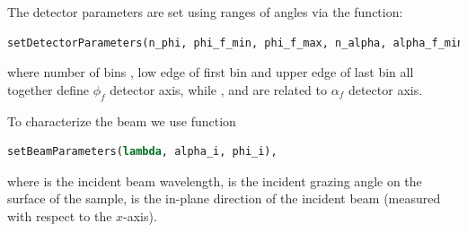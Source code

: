The detector parameters are set using ranges of angles via
the function:

\begin{lstlisting}[language=python, style=eclipse,numbers=none]
setDetectorParameters(n_phi, phi_f_min, phi_f_max, n_alpha, alpha_f_min, alpha_f_max),
\end{lstlisting}


\noindent where number of bins , low edge of first bin  and
upper edge of last bin  all together define $\phi_f$ detector axis, 
while ,  and  are related to 
$\alpha_f$ detector axis.

\vspace*{2mm}






\noindent To characterize the beam we use function 
\begin{lstlisting}[language=python, style=eclipse,numbers=none]
setBeamParameters(lambda, alpha_i, phi_i),
\end{lstlisting}

\noindent where  is the incident beam wavelength,
 is the incident
grazing angle on the surface of the sample,
 is the in-plane
direction of the incident beam (measured with respect to the $x$-axis).


